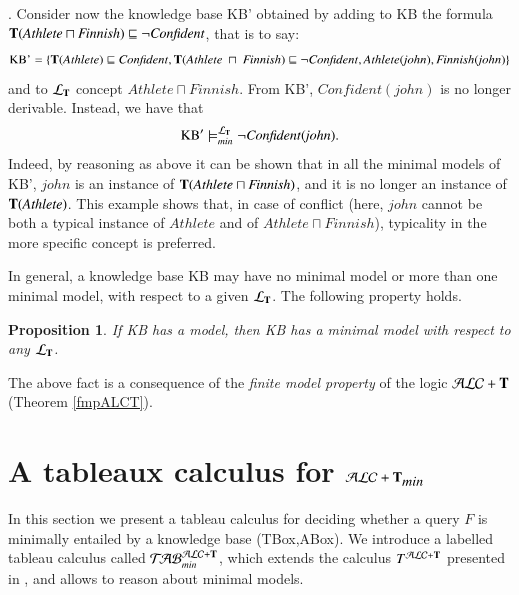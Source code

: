 \documentclass[a4paper, 11pt, oneside]{elsarticle}
\newcommand{\tip}{{\bf T}}
\newcommand{\alct}{\mathcal{ALC}+\tip}
\newcommand{\alctmin}{\mathcal{ALC}+\tip_{\mbox{\em min}}}
\newcommand{\sqset}{\sqsubseteq}
\newcommand{\mint}{\sqcap}
\newcommand{\ellet} {\mathcal{L}_{\bf T}}
\newcommand{\nuovoc}{\mathrel{{\mathcal{T}\!\mathcal{AB}}}_{min}^{\mathcal{ALC}+\mbox{\scriptsize $\tip$}}}
\newcommand{\calcolo}{T^{\mathcal{ALC}+\mbox{\scriptsize $\tip$}}}
\newtheorem{proposition}{Proposition}
\newcounter{posu}
\newtheorem{proposition}[posu]{Proposition}
\begin{document}
. Consider now the knowledge base KB' obtained by adding to KB the
formula $\tip(\mathit{Athlete} \mint \mathit{Finnish}) \sqsubseteq \neg \mathit{Confident}$, that is to say:
$$\mbox{KB'}  = \{ \tip(\mathit{Athlete}) \sqset \mathit{Confident}, \tip(\mathit{Athlete} \ \mint \ \mathit{Finnish}) \sqsubseteq \neg \mathit{Confident},
\mathit{Athlete}(\mathit{john}), \mathit{Finnish}(\mathit{john})\}$$
and to ${\ellet}$ concept
$\mathit{Athlete} \mint \mathit{Finnish}$. From KB', $\mathit{Confident}(\mathit{john})$ is no longer derivable.
Instead, we have that $$\mbox{KB}' \models_{min}^{\ellet} \neg \mathit{Confident}(\mathit{john}).$$ Indeed, by reasoning as above it can be shown that in all the minimal models of KB', $\mathit{john}$ is an instance of $\tip(\mathit{Athlete} \mint \mathit{Finnish})$, and it is
no longer an instance of $\tip(\mathit{Athlete})$. This example shows that, in case of
conflict (here, $\mathit{john}$ cannot be both a typical instance of $\mathit{Athlete}$ and of
$\mathit{Athlete} \mint \mathit{Finnish}$), typicality in the more specific concept is
preferred.

\vspace{0.35cm}

\noindent In general, a knowledge base KB may have no minimal model or more
than one minimal model, with respect to a given $\ellet$. The following property holds.

\begin{proposition}\label{proprModMinimali1}
If \emph{KB} has a model, then \emph{KB} has a minimal model with respect to
any $\ellet$.
\end{proposition}

The above fact  is  a consequence of the \emph{finite model property} of the logic $\alct$ (Theorem \ref{fmpALCT}).




\section{A tableaux calculus for $\alctmin$}

In this section we present a tableau calculus for deciding whether
a query $F$ is minimally entailed by a knowledge base (TBox,ABox).
We introduce a labelled tableau calculus  called $\nuovoc$, which
extends the calculus $\calcolo$ presented in \cite{FI09}, and
allows to reason about minimal models.
\end{document}
